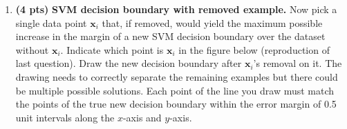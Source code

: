 \documentclass{article}
\begin{document}
\begin{enumerate}[1.]
\begin{center}
\end{center}

\newpage

\item {\bf (4 pts)} {\bf  SVM decision boundary with removed example.} Now pick a single data point $\mathbf{x}_i$ that, if removed, would yield the maximum possible increase in the margin of a new SVM decision boundary over the dataset without $\mathbf{x}_i$. Indicate which point is $\mathbf{x}_i$ in the figure below (reproduction of last question). Draw the new decision boundary after $\mathbf{x}_i$'s removal on it. The drawing needs to correctly separate the remaining examples but there could be multiple possible solutions. Each point of the line you draw must match the points of the true new decision boundary within the error margin of 0.5 unit intervals along the $x$-axis and $y$-axis.

\begin{center}
\end{center}


 
 

\end{enumerate}
\end{document}
